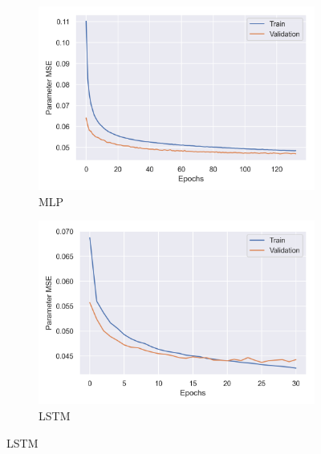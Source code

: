 \begin{figure}[t]
    \centering
    \begin{subfigure}[b]{0.49\textwidth}
        \centering
        \includegraphics[width=\textwidth]{figures/inverse-synth/loss-plots/mlp-mel.png}
        \caption{MLP}
    \end{subfigure}
    \begin{subfigure}[b]{0.49\textwidth}
        \centering
        \includegraphics[width=\textwidth]{figures/inverse-synth/loss-plots/lstm-mel.png}
        \caption{LSTM}
    \end{subfigure}
    
    \vspace{1cm}
    

\end{figure}
